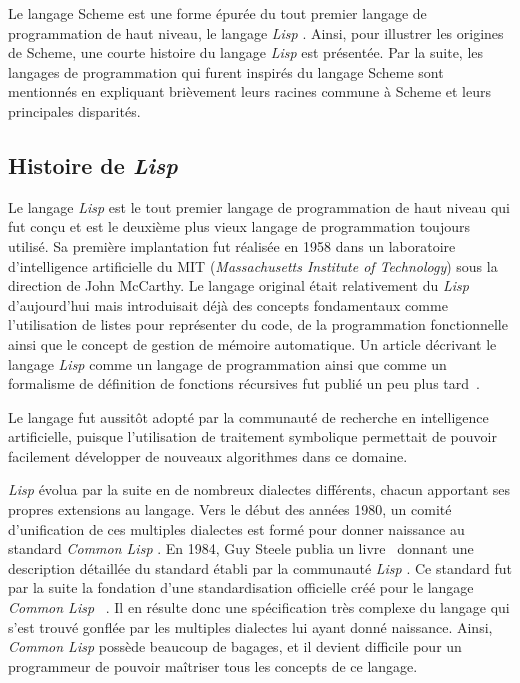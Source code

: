 \documentclass[12pt,oneside,letterpaper,francais]{book}
\newcommand{\lisp}{{\textit{Lisp }}}
\newcommand{\clisp}{{\textit{Common Lisp }}}
\begin{document}
Le langage Scheme est une forme épurée du tout premier langage de
programmation de haut niveau, le langage \lisp. Ainsi, pour illustrer
les origines de Scheme, une courte histoire du langage \lisp est
présentée. Par la suite, les langages de programmation qui furent
inspirés du langage Scheme sont mentionnés en expliquant brièvement
leurs racines commune à Scheme et leurs principales disparités.

\subsection{Histoire de \lisp}
Le langage \lisp est le tout premier langage de programmation de haut
niveau qui fut conçu et est le deuxième plus vieux langage de
programmation toujours utilisé. Sa première implantation fut réalisée
en 1958 dans un laboratoire d'intelligence artificielle du MIT
(\textit{Massachusetts Institute of Technology}) sous la direction de
John McCarthy. Le langage original était relativement du \lisp
d'aujourd'hui mais introduisait déjà des concepts fondamentaux comme
l'utilisation de listes pour représenter du code, de la programmation
fonctionnelle ainsi que le concept de gestion de mémoire
automatique. Un article décrivant le langage \lisp comme un langage de
programmation ainsi que comme un formalisme de définition de fonctions
récursives fut publié un peu plus tard~\cite{LISP_ORIGINS}.

Le langage fut aussitôt adopté par la communauté de recherche en
intelligence artificielle, puisque l'utilisation de traitement
symbolique permettait de pouvoir facilement développer de nouveaux
algorithmes dans ce domaine.

\lisp évolua par la suite en de nombreux dialectes différents, chacun
apportant ses propres extensions au langage. Vers le début des années
1980, un comité d'unification de ces multiples dialectes est formé
pour donner naissance au standard \clisp. En 1984, Guy Steele publia
un livre~\cite{CLISP} donnant une description détaillée du standard
établi par la communauté \lisp. Ce standard fut par la suite la
fondation d'une standardisation officielle créé pour le langage
\clisp~\cite{ANSI_CLISP}. Il en résulte donc une spécification très
complexe du langage qui s'est trouvé gonflée par les multiples
dialectes lui ayant donné naissance. Ainsi, \clisp possède beaucoup de
bagages, et il devient difficile pour un programmeur de pouvoir
maîtriser tous les concepts de ce langage.
\end{document}
